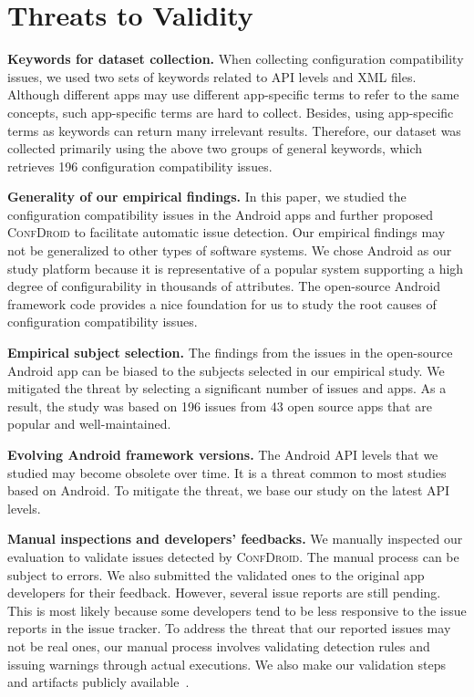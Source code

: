 \section{Threats to Validity}

{\textbf{Keywords for dataset collection.} When collecting configuration compatibility issues, we used two sets of keywords related to API levels and XML files. Although different apps may use different app-specific terms to refer to the same concepts,   such app-specific terms are hard to collect. Besides, using app-specific terms as keywords can return many irrelevant results. Therefore, our dataset was collected primarily using the above two groups of general keywords, which retrieves 196 configuration compatibility issues.
}

\textbf{Generality of our empirical findings.}
In this paper, we studied the configuration compatibility issues in the Android apps and further proposed \textsc{ConfDroid} to facilitate automatic issue detection.
Our empirical findings may not be generalized to other types of software systems.
We chose Android as our study platform because it is representative of a popular system supporting a high degree of configurability in thousands of attributes.
The open-source Android framework code provides a nice foundation for us to
study the root causes of configuration compatibility issues.

\textbf{Empirical subject selection.}
The findings from the issues in the open-source Android app can be biased to the subjects selected in our empirical study.
We mitigated the threat by selecting a significant number of issues and apps.
As a result, the study was based on 196 issues from 43 open source apps that are popular and well-maintained.

\textbf{Evolving Android framework versions.} The Android API
levels that we studied may become obsolete over time. It is a threat
common to most studies based on Android. To mitigate the
threat, we base our study on the latest API levels.

{\textbf{Manual inspections and developers' feedbacks.} We manually inspected our evaluation to validate issues detected by \textsc{ConfDroid}. The manual process can be subject to errors. We also submitted the validated ones to the original app developers for their feedback. 
However, several issue reports are still pending. This is most likely because some developers tend to be less responsive to the issue reports in the issue tracker. To address the threat that our reported issues may not be real ones, our manual process involves validating detection rules and issuing warnings through actual executions. We also make our validation steps and artifacts publicly available~\cite{confdroid}.}

